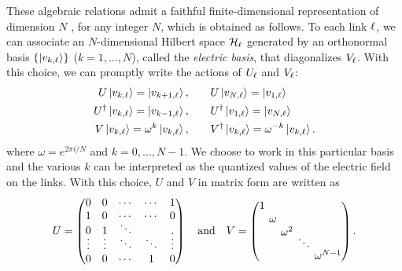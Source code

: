 \begin{figure}[t]
\end{figure}


These algebraic relations admit a faithful finite-dimensional representation of dimension $N$ \cite{weyl1950theory}, for any integer $N$, which is obtained as follows.
To each link $\ell$, we can associate an $N$-dimensional Hilbert space $\mathcal{H}_\ell$ generated by an orthonormal basis $\{\ket{v_{k,\ell}}\}$ ($k=1, \dots,N$), called the \emph{electric basis}, that diagonalizes $V_\ell$.
With this choice, we can promptly write the actions of $U_\ell$ and $V_\ell$:
\begin{equation}
    \begin{split}
        U\ket{v_{k,\ell}}           = \ket{v_{k+1,\ell}}, & \qquad
        U\ket{v_{N,\ell}}           = \ket{v_{1,\ell}}\\
        U^{\dagger}\ket{v_{k,\ell}} = \ket{v_{k-1,\ell}}, & \qquad
        U^\dagger\ket{v_{1,\ell}}   = \ket{v_{N,\ell}}\\
        V\ket{v_{k,\ell}}           = \omega^k \ket{v_{k,\ell}}, & \qquad
        V^\dagger\ket{v_{k,\ell}}   = \omega^{-k} \ket{v_{k,\ell}}.
    \end{split}
    \label{eq:elect_basis_op_action}
\end{equation}
where $\omega = e^{2 \pi i / N}$ and $k = 0, \dots, N-1$.
We choose to work in this particular basis and the various $k$ can be interpreted as the quantized values of the electric field on the links.
With this choice, $U$ and $V$ in matrix form are written as
\begin{equation}
    U =
    \setlength\arraycolsep{5pt}
    \begin{pmatrix}
        0      & 0      & \cdots & \cdots & 1      \\
        1      & 0      & \cdots & \cdots & 0      \\[-5pt]
        0      & 1      & \ddots &        & . \\[-5pt]
        \vdots & \vdots & \ddots & \ddots & \vdots \\
        0      & 0      & \cdots & 1      & 0
    \end{pmatrix}
    \qand
    \setlength\arraycolsep{2pt}
    V =
    \begin{pmatrix}
        1 \\
        & \omega \\
        &         & \omega^2 \\[-7pt]
        &         &           & \ddots \\[-2pt]
        &         &           &         & \omega^{N-1}
    \end{pmatrix}.
\end{equation}

